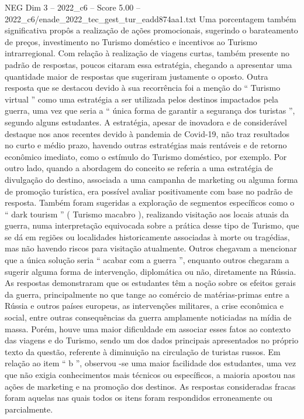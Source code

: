\begin{textsample}{NEG Dim 3 – 2022\_c6 – Score 5.00 – 2022\_c6/enade\_2022\_tec\_gest\_tur\_eadd874aa1.txt}
Uma porcentagem também significativa propôs a realização de ações promocionais, sugerindo o barateamento de preços, investimento no Turismo doméstico e incentivos ao Turismo intrarregional.
Com relação à realização de viagens curtas, também presente no padrão de respostas, poucos citaram essa estratégia, chegando a apresentar uma quantidade maior de respostas que sugeriram justamente o oposto.
Outra resposta que se destacou devido à sua recorrência foi a menção do “ Turismo virtual ” como uma estratégia a ser utilizada pelos destinos impactados pela guerra, uma vez que seria a “ única forma de garantir a segurança dos turistas ”, segundo alguns estudantes.
A estratégia, apesar de inovadora e de considerável destaque nos anos recentes devido à pandemia de Covid-19, não traz resultados no curto e médio prazo, havendo outras estratégias mais rentáveis e de retorno econômico imediato, como o estímulo do Turismo doméstico, por exemplo.
Por outro lado, quando a abordagem do conceito se referia a uma estratégia de divulgação do destino, associada a uma campanha de marketing ou alguma forma de promoção turística, era possível avaliar positivamente com base no padrão de resposta.
Também foram sugeridas a exploração de segmentos específicos como o “ dark tourism ” ( Turismo macabro ), realizando visitação aos locais atuais da guerra, numa interpretação equivocada sobre a prática desse tipo de Turismo, que se dá em regiões ou localidades historicamente associadas à morte ou tragédias, mas não havendo riscos para visitação atualmente.
Outros chegavam a mencionar que a única solução seria “ acabar com a guerra ”, enquanto outros chegaram a sugerir alguma forma de intervenção, diplomática ou não, diretamente na Rússia.
As respostas demonstraram que os estudantes têm a noção sobre os efeitos gerais da guerra, principalmente no que tange ao comércio de matérias-primas entre a Rússia e outros países europeus, as intervenções militares, a crise econômica e social, entre outras consequências da guerra amplamente noticiadas na mídia de massa.
Porém, houve uma maior dificuldade em associar esses fatos ao contexto das viagens e do Turismo, sendo um dos dados principais apresentados no próprio texto da questão, referente à diminuição na circulação de turistas russos.
Em relação ao item “ b ”, observou -se uma maior facilidade dos estudantes, uma vez que não exigia conhecimentos mais técnicos ou específicos, a maioria apostou nas ações de marketing e na promoção dos destinos.
As respostas consideradas fracas foram aquelas nas quais todos os itens foram respondidos erroneamente ou parcialmente.

\end{textsample}
